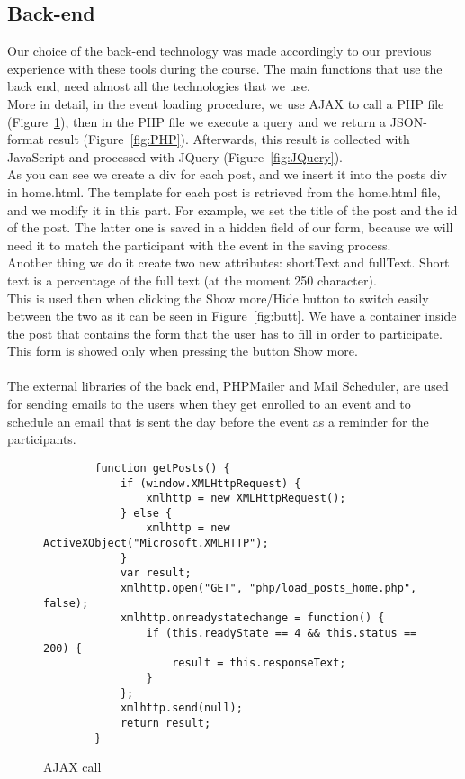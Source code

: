 \documentclass[a4paper]{article}
\begin{document}
	\subsection{Back-end}
	Our choice of the back-end technology was made accordingly to our previous experience with these tools during the course. The main functions that use the back end, need almost all the technologies that we use. \\
	More in detail, in the event loading procedure, we use AJAX to call a PHP file (Figure~\ref{fig:AJAX}), then in the PHP file we execute a query and we return a JSON-format result (Figure~\ref{fig:PHP}). Afterwards, this result is collected with JavaScript and processed with JQuery (Figure~\ref{fig:JQuery}). \\
	As you can see we create a div for each post, and we insert it into the posts div in home.html. The template for each post is retrieved from the home.html file, and we modify it in this part. For example, we set the title of the post and the id of the post. The latter one is saved in a hidden field of our form, because we will need it to match the participant with the event in the saving process.\\
	Another thing we do it create two new attributes: shortText and fullText. Short text is a percentage of the full text (at the moment 250 character).\\
	This is used then when clicking the Show more/Hide button to switch easily between the two as it can be seen in Figure~\ref{fig:butt}. We have a container inside the post that contains the form that the user has to fill in order to participate. This form is showed only when pressing the button Show more.\\\\
	The external libraries of the back end, PHPMailer and Mail Scheduler, are used for sending emails to the users when they get enrolled to an event and to schedule an email that is sent the day before the event as a reminder for the participants.
	\begin{figure}
		\centering
		\begin{BVerbatim}
		function getPosts() {
			if (window.XMLHttpRequest) {
				xmlhttp = new XMLHttpRequest();
			} else {
				xmlhttp = new ActiveXObject("Microsoft.XMLHTTP");
			}
			var result;
			xmlhttp.open("GET", "php/load_posts_home.php", false);
			xmlhttp.onreadystatechange = function() {
				if (this.readyState == 4 && this.status == 200) {
					result = this.responseText;
				}
			};
			xmlhttp.send(null);
			return result;
		}
		\end{BVerbatim}
		\caption{AJAX call}
		\label{fig:AJAX}
	\end{figure}
\end{document}
